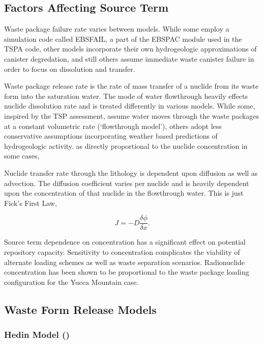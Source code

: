 \subsection{Factors Affecting Source Term}

Waste package failure rate varies between models. While 
some employ a simulation code called EBSFAIL, a part of the EBSPAC 
module used in the TSPA code, other models incorporate their own 
hydrogeologic approximations of canister degredation, and still others 
assume immediate waste canister failure in order to focus on 
dissolution and transfer. 

Waste package release rate is the rate of mass transfer 
of a nuclide from its waste form into the saturation water.
The mode of water flowthrough heavily effects nuclide dissolution rate 
and is treated differently in various models. While some, inspired by 
the TSP assessment, assume water moves through the waste packages at a 
constant volumetric rate (`flowthrough model'), others adopt less 
conservative assumptions incorporating weather based predictions of 
hydrogeologic activity. as directly proportional to the nuclide 
concentration in some cases,  

Nuclide transfer rate through the lithology is  dependent upon diffusion 
as well as advection.  The diffusion coefficient varies per nuclide and 
is heavily dependent upon the concentration of that nuclide in the 
flowthrough water. This is just Fick's First Law, 

\begin{equation}
J = -D\frac{\delta\phi}{\delta x}.
\end{equation}

Source term dependence on concentration has a significant 
effect on potential repository capacity. Sensitivity to concentration 
complicates the viability of alternate loading schemes as well as 
waste separation scenarios. Radionuclide concentration has been shown 
to be proportional to the waste package loading configuration for the 
Yucca Mountain case.\cite{ahn_relationship_2002,kawasaki_congruent_2004}

\subsection{Waste Form Release Models}

\subsubsection{Hedin Model (\cite{hedin_integrated_2002})}

